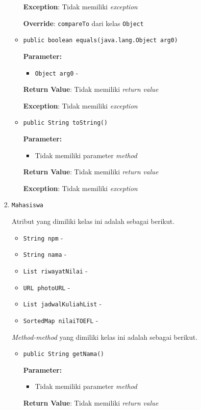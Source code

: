 \documentclass{article}
\begin{document}
\begin{enumerate}
\begin{itemize}
\textbf{Exception}: Tidak memiliki \textit{exception}

\textbf{Override}: \texttt{compareTo} dari kelas \texttt{Object}

\item \texttt{public boolean equals(java.lang.Object arg0)}



\textbf{Parameter:}
\begin{itemize}
\item \texttt{Object arg0} - 
\end{itemize}
\textbf{Return Value}: Tidak memiliki \textit{return value}

\textbf{Exception}: Tidak memiliki \textit{exception}

\item \texttt{public String toString()}



\textbf{Parameter:}
\begin{itemize}
\item Tidak memiliki parameter \textit{method}
\end{itemize}
\textbf{Return Value}: Tidak memiliki \textit{return value}

\textbf{Exception}: Tidak memiliki \textit{exception}

\end{itemize}
\item \texttt{Mahasiswa}



Atribut yang dimiliki kelas ini adalah sebagai berikut.
\begin{itemize}
\item \texttt{String npm} - 
\item \texttt{String nama} - 
\item \texttt{List riwayatNilai} - 
\item \texttt{URL photoURL} - 
\item \texttt{List jadwalKuliahList} - 
\item \texttt{SortedMap nilaiTOEFL} - 
\end{itemize}
\textit{Method-method} yang dimiliki kelas ini adalah sebagai berikut.
\begin{itemize}
\item \texttt{public String getNama()}



\textbf{Parameter:}
\begin{itemize}
\item Tidak memiliki parameter \textit{method}
\end{itemize}
\textbf{Return Value}: Tidak memiliki \textit{return value}


\end{itemize}
\end{enumerate}
\end{document}
